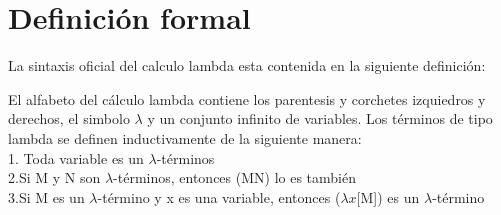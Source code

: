  \section{Definición formal}

 La sintaxis oficial del calculo lambda esta contenida en la siguiente definición:

 \begin{definition}[]
   El alfabeto del cálculo lambda contiene los parentesis y corchetes izquiedros y derechos, el simbolo $\lambda$ y un conjunto infinito de variables. Los términos de tipo lambda se definen inductivamente de la siguiente manera:\\
   1. Toda variable es un $\lambda$-términos\\
   2.Si M y N son $\lambda$-términos, entonces (MN) lo es también\\
   3.Si M es un $\lambda$-término y x es una variable, entonces ($\lambda$$x$[M]) es un $\lambda$-término\\
\end{definition}

